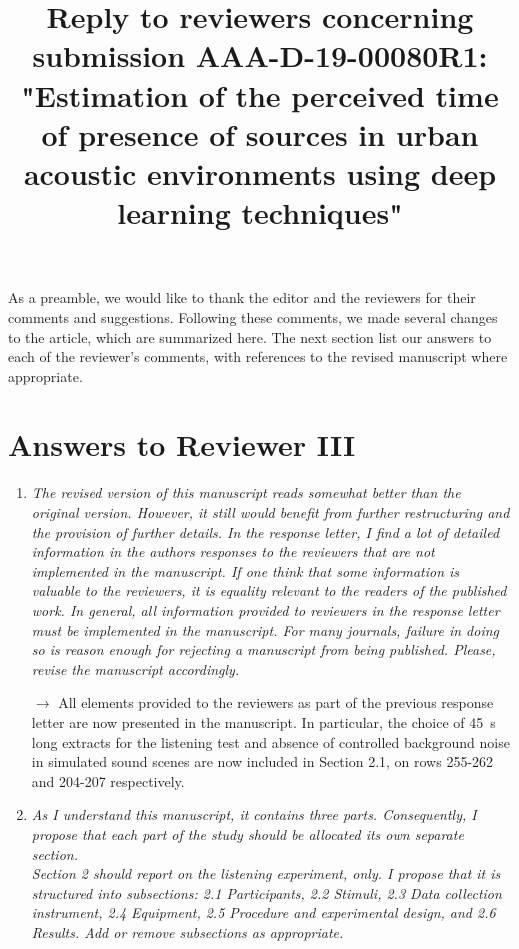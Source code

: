 \documentclass[10pt]{article}
\title{Reply to reviewers concerning submission AAA-D-19-00080R1: "Estimation of the perceived time of presence of sources in urban acoustic environments using deep learning techniques"}
\begin{document}
\maketitle

As a preamble, we would like to thank the editor and the reviewers for their comments and suggestions. Following these comments, we made several changes to the article, which are summarized here. The next section list our answers to each of the reviewer’s comments, with references to the revised manuscript where appropriate.


\section{Answers to Reviewer III}

\begin{enumerate}

\item \emph{The revised version of this manuscript reads somewhat better than the original version. However, it still would benefit from further restructuring and the provision of further details. In the response letter, I find a lot of detailed information in the authors responses to the reviewers that are not implemented in the manuscript. If one think that some information is valuable to the reviewers, it is equality relevant to the readers of the published work. In general, all information provided to reviewers in the response letter must be implemented in the manuscript. For many journals, failure in doing so is reason enough for rejecting a manuscript from being published. Please, revise the manuscript accordingly.}

$\rightarrow$ All elements provided to the reviewers as part of the previous response letter are now presented in the manuscript. In particular, the choice of 45~s long extracts for the listening test and absence of controlled background noise in simulated sound scenes are now included in Section 2.1, on rows 255-262 and 204-207 respectively.

\item \emph{As I understand this manuscript, it contains three parts. Consequently, I propose that each part of the study should be allocated its own separate section.\\
Section 2 should report on the listening experiment, only. I propose that it is structured into subsections: 2.1 Participants, 2.2 Stimuli, 2.3 Data collection instrument, 2.4 Equipment, 2.5 Procedure and experimental design, and 2.6 Results. Add or remove subsections as appropriate.}


\end{enumerate}
\end{document}
